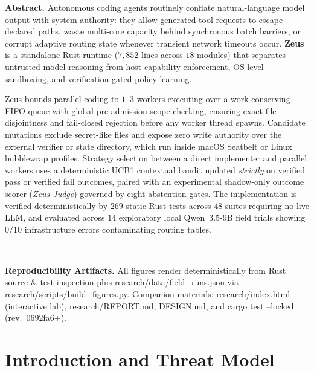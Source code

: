 \documentclass[10pt,letterpaper]{article}
\newcommand{\code}[1]{\textnormal{\small\ttfamily #1}}
\begin{document}
\begin{tcolorbox}[
  enhanced,
  colback=zeusPanel,
  colframe=zeusRule,
  boxrule=0.6pt,
  arc=4pt,
  left=12pt,
  right=12pt,
  top=8pt,
  bottom=8pt
]
\textbf{\sffamily\color{zeusBolt} Abstract.}\quad
Autonomous coding agents routinely conflate natural-language model output with system authority: they allow generated tool requests to escape declared paths, waste multi-core capacity behind synchronous batch barriers, or corrupt adaptive routing state whenever transient network timeouts occur. \textbf{Zeus} is a standalone Rust runtime ($7{,}852$ lines across $18$ modules) that separates untrusted model reasoning from host capability enforcement, OS-level sandboxing, and verification-gated policy learning.

Zeus bounds parallel coding to $1$--$3$ workers executing over a work-conserving FIFO queue with global pre-admission scope checking, ensuring exact-file disjointness and fail-closed rejection before any worker thread spawns. Candidate mutations exclude secret-like files and expose zero write authority over the external verifier or state directory, which run inside macOS Seatbelt or Linux \code{bubblewrap} profiles. Strategy selection between a direct implementer and parallel workers uses a deterministic UCB1 contextual bandit updated \emph{strictly} on verified pass or verified fail outcomes, paired with an experimental shadow-only outcome scorer (\emph{Zeus Judge}) governed by eight abstention gates. The implementation is verified deterministically by $269$ static Rust tests across $48$ suites requiring no live LLM, and evaluated across $14$ exploratory local Qwen~3.5-9B field trials showing $0/10$ infrastructure errors contaminating routing tables.\\[5pt]
{\color{zeusRule}\rule{\linewidth}{0.5pt}}\\[4pt]
{\footnotesize\textbf{\sffamily\color{zeusSlate} Reproducibility Artifacts.}\quad
All figures render deterministically from Rust source \& test inspection plus \code{research/data/field\_runs.json} via \code{research/scripts/build\_figures.py}. Companion materials: \code{research/index.html} (interactive lab), \code{research/REPORT.md}, \code{DESIGN.md}, and \code{cargo test --locked} (rev.\ \code{0692fa6+}).}
\end{tcolorbox}

\clearpage

\section{Introduction and Threat Model}
\label{sec:intro}
\end{document}
